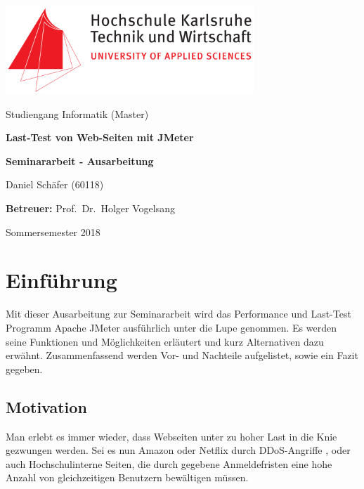 \documentclass[a4paper,12pt]{article}
\author{Daniel Sch\"afer} \let\Author\@author
\begin{document}
\begin{titlepage}
	\centering
	\includegraphics[width=0.7\textwidth]{bilder/hskalogo}\par\vspace{1cm}
	\vspace{0.5cm}
	{\Large Studiengang Informatik (Master)}\par
	\vspace{2cm}
	{\huge\bfseries Last-Test von Web-Seiten mit JMeter}\par
	\vspace{2cm}
	{\Large\bfseries Seminararbeit - Ausarbeitung}\par
	\vspace{0.5cm}
	\vspace{3cm}
	
	{\Large Daniel Schäfer (60118)\par}
	\vspace{1cm}
	{\Large\textbf{Betreuer:} Prof.~Dr.~Holger Vogelsang} 
	\vfill
	{\Large Sommersemester 2018\par}
	\vfill
\end{titlepage}

\setcounter{page}{2}
\thispagestyle{empty}
\tableofcontents
\pagebreak

\setcounter{page}{4}

\section{Einführung}
Mit dieser Ausarbeitung zur Seminararbeit wird das Performance und Last-Test Programm Apache JMeter ausführlich unter die Lupe genommen. Es werden seine Funktionen und Möglichkeiten erläutert und kurz Alternativen dazu erwähnt. Zusammenfassend werden Vor- und Nachteile aufgelistet, sowie ein Fazit gegeben.

\subsection{Motivation}
Man erlebt es immer wieder, dass Webseiten unter zu hoher Last in die Knie gezwungen werden. Sei es nun Amazon oder Netflix durch DDoS-Angriffe \cite{online:AmazonDDoS}, oder auch Hochschulinterne Seiten, die durch gegebene Anmeldefristen eine hohe Anzahl von gleichzeitigen Benutzern bewältigen müssen. 
\end{document}
